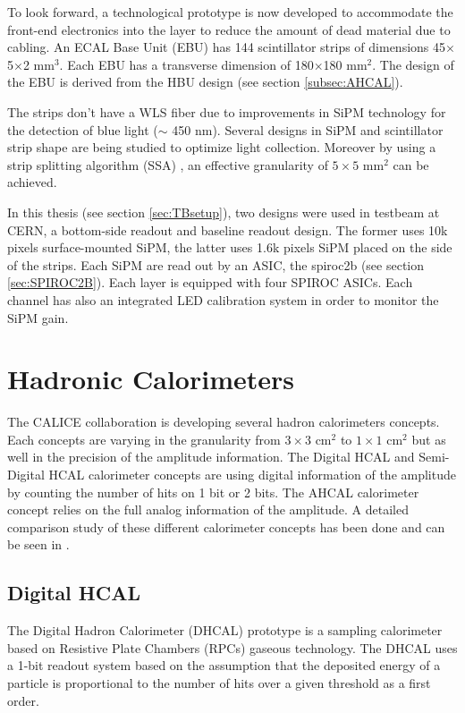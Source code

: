 To look forward, a technological prototype is now developed to accommodate the front-end electronics into the layer to reduce the amount of dead material due to cabling. An ECAL Base Unit (EBU) has 144 scintillator strips of dimensions 45$\times$5$\times$2 mm$^3$. Each EBU has a transverse dimension of 180$\times$180 mm$^2$. The design of the EBU is derived from the HBU design (see section \ref{subsec:AHCAL}).

The strips don't have a WLS fiber due to improvements in SiPM technology for the detection of blue light ($\sim$ 450 nm). Several designs in SiPM and scintillator strip shape are being studied to optimize light collection. Moreover by using a strip splitting algorithm (SSA) \cite{Kotera:2014psa}, an effective granularity of $5\times5$ mm$^2$ can be achieved.

In this thesis (see section \ref{sec:TBsetup}), two designs were used in testbeam at CERN, a bottom-side readout and baseline readout design. The former uses 10k pixels surface-mounted SiPM, the latter uses 1.6k pixels SiPM placed on the side of the strips. Each SiPM are read out by an ASIC, the \acrshort{spiroc2b} (see section \ref{sec:SPIROC2B}). Each layer is equipped with four SPIROC ASICs. Each channel has also an integrated LED calibration system in order to monitor the SiPM gain.

\section{Hadronic Calorimeters}
\label{sec:HadCal}

The CALICE collaboration is developing several hadron calorimeters concepts. Each concepts are varying in the granularity from $3\times3$ cm$^2$ to $1\times1$ cm$^2$ but as well in the precision of the amplitude information. The Digital HCAL and Semi-Digital HCAL calorimeter concepts are using digital information of the amplitude by counting the number of hits on 1 bit or 2 bits. The AHCAL calorimeter concept relies on the full analog information of the amplitude. A detailed comparison study of these different calorimeter concepts has been done and can be seen in \cite{Neubueser2016}.

\subsection{Digital HCAL}

The Digital Hadron Calorimeter (DHCAL) prototype \cite{Bilki:2013bea} is a sampling calorimeter based on Resistive Plate Chambers (RPCs) gaseous technology. The DHCAL uses a 1-bit readout system based on the assumption that the deposited energy of a particle is proportional to the number of hits over a given threshold as a first order.

